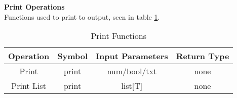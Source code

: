 \textbf{Print Operations}\\
Functions used to print to output, seen in table \ref{tbl:print}.
\begin{table}[h]
	\centering
	\caption{Print Functions}
	\label{tbl:print}
	\begin{tabular}{|c|c|c|c|}
		\hline
		Operation  & Symbol    & Input Parameters & Return Type \\ \hline
		Print      & print     & num/bool/txt     & none        \\ \hline
		Print List & print     & list[T]          & none        \\ \hline
	\end{tabular}
\end{table}
\newpage